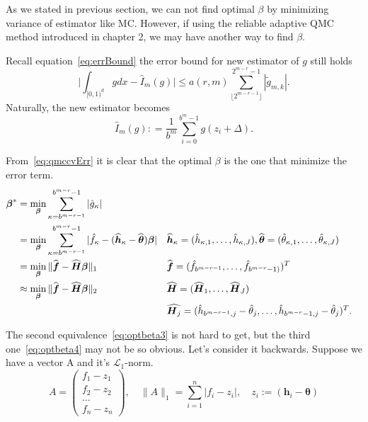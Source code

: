 
As we stated in previous section, we can not find optimal $\beta$ by minimizing variance of estimator like MC. 
However, if using the reliable adaptive QMC method introduced in chapter 2, we may have another way to find $\beta$.

Recall equation~\eqref{eq:errBound} the error bound for new estimator of $g$ still holds
\begin{equation}\label{eq:qmccvErr}
	\Big|\int_{[0,1)^d}gdx - \hat{I}_m(g)\Big| \leq a(r,m) \sum_{\lfloor 2^{m-r-1} \rfloor}^{2^{m-r}-1} |\tilde{g}_{m,k}|.
\end{equation}
Naturally, the new estimator becomes
\begin{equation}\label{eq:estcv}
    \hat{I}_m({g}): = \frac{1}{b^m}\sum_{i=0}^{b^m-1}g(z_i+\Delta).
\end{equation}


From~\eqref{eq:qmccvErr} it is clear that the optimal $\beta$ is the one that minimize the error term. 
\begin{align}
    \notag
    \boldsymbol{\beta}^*
    &=\min_{\boldsymbol{\beta}}\sum_{\kappa=b^{m-r-1}}^{b^{m-r}-1} |\hat{g}_{\kappa}|\\
    \label{eq:optbeta2}
    &=\min_{\boldsymbol{\beta}}\sum_{\kappa=b^{m-r-1}}^{b^{m-r}-1}|\hat{f}_\kappa
    -(\widehat{\boldsymbol{h}}_\kappa - \widehat{\boldsymbol{\theta}})\boldsymbol{\boldsymbol{\beta}}|
    && \widehat{\boldsymbol{h}}_\kappa=(\hat{h}_{\kappa,1},\dots, \hat{h}_{\kappa,J}),
    \widehat{\boldsymbol{\theta}}=(\hat{\theta}_{\kappa,1},\dots,\hat{\theta}_{\kappa,J})\\
    \label{eq:optbeta3}
    &=\min_{\boldsymbol{\beta}}\|\widehat{\boldsymbol{f}}-\widehat{\boldsymbol{H}}\boldsymbol{\beta}\|_1
    && \widehat{\boldsymbol{f}}= (\hat{f}_{b^{m-r-1}},\dots,\hat{f}_{b^{m-r}-1)})^T \\
    \label{eq:optbeta4}
    &\approx\min_{\boldsymbol{\beta}}\|\widehat{\boldsymbol{f}}-\widehat{\boldsymbol{H}}\boldsymbol{\beta}\|_2
    && \widehat{\boldsymbol{H}}= (\widehat{\boldsymbol{H}}_1, \dots, \widehat{\boldsymbol{H}}_J)\\
    & \notag 
    &&\widehat{\boldsymbol{H}_j}=(\hat{h}_{b^{m-r-1},j}-\hat{\theta}_j,\dots, \hat{h}_{b^{m-r}-1,j}-\hat{\theta}_j)^T.
\end{align}

The second equivalence~\eqref{eq:optbeta3} is not hard to get, but the third one~\eqref{eq:optbeta4} may not be so obvious. Let's consider it backwards. Suppose we have a vector A and it's $\mathcal{L}_1$-norm.
\[
   A=
    \begin{pmatrix}
        f_1-z_1\\
        f_2-z_2\\
        \hdots\\
        f_n-z_n
    \end{pmatrix},\quad
    \|A\|_1=\sum_{i=1}^{n}|f_i-z_i|, \quad
    z_i:=(\boldsymbol{h}_i-\boldsymbol{\theta})
\]

